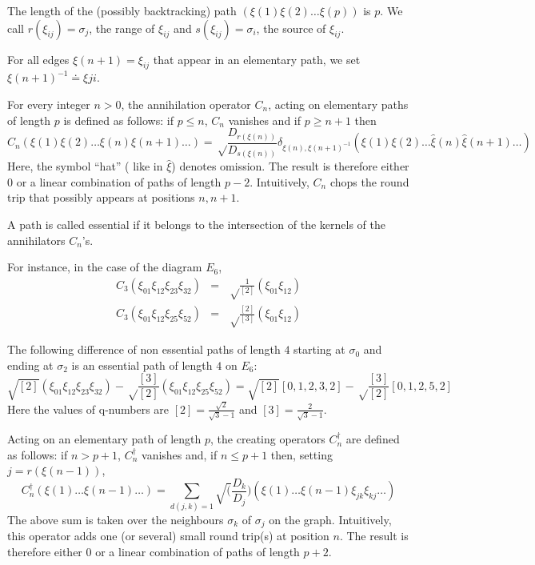 \documentclass[a4paper,11pt]{article}
\begin{document}
The length of the (possibly backtracking) path $( \xi(1)\xi(2)\ldots
\xi(p) )$ is $p$.
We call $r(\xi_{ij})=\sigma_{j}$, the range of $\xi_{ij}$
and $s(\xi_{ij})=\sigma_{i}$, the source of $\xi_{ij}$.

For all edges $\xi(n+1) = \xi_{ij}$ that appear in an elementary path,
we set  ${\xi(n+1)}^{-1} \doteq \xi{ji}$.

For every integer $n >0$, the annihilation operator $C_{n}$,
acting on elementary paths of length $p$ is defined
as follows:  if $p \leq n$, $C_{n}$ vanishes and if $ p \geq  n+1$ then
$$
C_{n} (\xi(1)\xi(2)\ldots\xi(n)\xi(n+1)\ldots) =
\sqrt\frac{D_{r(\xi(n))}}{D_{s(\xi(n))}}
\delta_{\xi(n),{\xi(n+1)}^{-1}}
      (\xi(1)\xi(2)\ldots{\hat\xi(n)}{\hat\xi(n+1)}\ldots)
$$
Here, the symbol ``hat'' ( like  in $\hat \xi$) denotes omission.
The result is therefore either $0$ or a linear combination of paths
of length $p-2$.
Intuitively, $C_{n}$ chops the round trip that possibly appears
at positions $n,n+1$.

A path is called essential if it belongs to
the intersection of the kernels
of the annihilators $C_{n}$'s.

For instance, in the case of the diagram $E_{6}$,
\begin{eqnarray*}
C_{3}(\xi_{01}\xi_{12}\xi_{23}\xi_{32}) &=&  \sqrt \frac {1}{[2]}
(\xi_{01}\xi_{12}) \\
C_{3}(\xi_{01}\xi_{12}\xi_{25}\xi_{52}) &=&  \sqrt \frac {[2]}{[3]}
(\xi_{01}\xi_{12})
      \end{eqnarray*}

The following difference of non essential paths of length $4$
starting at $\sigma_{0}$ and ending at $\sigma_{2}$
is an essential path of length $4$  on $E_{6}$:
$$\sqrt{[2]} (\xi_{01}\xi_{12}\xi_{23}\xi_{32})  - \sqrt
\frac{[3]}{[2]} (\xi_{01}\xi_{12}\xi_{25}\xi_{52})
= \sqrt {[2]}  [0,1,2,3,2]- \sqrt \frac{[3]}{[2]}[0,1,2,5,2]$$
Here the values of q-numbers are $[2] = \frac{\sqrt 2}{\sqrt 3 -1}$ and $[3] =
\frac{2}{\sqrt 3 -1}$.

Acting on an elementary path of length $p$, the creating operators
$C^{\dag}_{n}$ are defined as follows:
if $n > p+1$, $C^{\dag}_{n}$ vanishes and, if $n \leq p+1$ then,
setting $j = r(\xi(n-1))$,
$$
C^{\dag}_{n} (\xi(1)\ldots\xi(n-1)\ldots) = \sum_{d(j,k)=1}
\sqrt(\frac{D_{k}}{D_{j}})  (\xi(1)\ldots\xi(n-1)\xi_{jk}\xi_{kj}\ldots)
$$
The above sum is taken over the neighbours $\sigma_{k}$ of
$\sigma_{j}$ on the graph.
Intuitively, this operator adds one  (or several) small round trip(s)
at position $n$.
The result is therefore either $0$ or a linear combination of paths of
length $p+2$.
\end{document}
